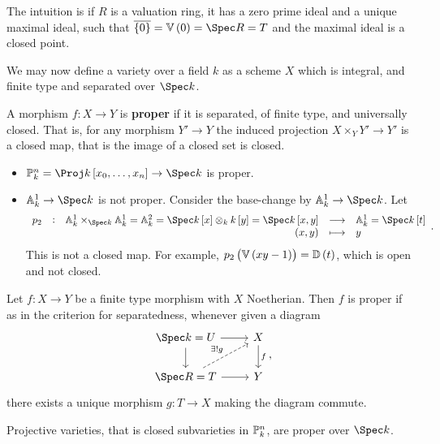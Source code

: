 
The intuition is if $ R $ is a valuation ring, it has a zero prime ideal and a unique maximal ideal, such that $ \overline{\cbr{0}} = \VV\br{0} = \Spec R = T $ and the maximal ideal is a closed point.

\begin{remark*}
We may now define a variety over a field $ k $ as a scheme $ X $ which is integral, and finite type and separated over $ \Spec k $.
\end{remark*}

\begin{definition*}
A morphism $ f : X \to Y $ is \textbf{proper} if it is separated, of finite type, and universally closed. That is, for any morphism $ Y' \to Y $ the induced projection $ X \times_Y Y' \to Y' $ is a closed map, that is the image of a closed set is closed.
\end{definition*}

\begin{example*}
\hfill
\begin{itemize}
\item $ \PP_k^n = \Proj k\sbr{x_0, \dots, x_n} \to \Spec k $ is proper.
\item $ \AA_k^1 \to \Spec k $ is not proper. Consider the base-change by $ \AA_k^1 \to \Spec k $. Let
$$ \function[p_2]{\AA_k^1 \times_{\Spec k} \AA_k^1 = \AA_k^2 = \Spec k\sbr{x} \otimes_k k\sbr{y} = \Spec k\sbr{x, y}}{\AA_k^1 = \Spec k\sbr{t}}{\br{x, y}}{y}. $$
This is not a closed map. For example, $ p_2\br{\VV\br{xy - 1}} = \DD\br{t} $, which is open and not closed.
\end{itemize}
\end{example*}

\begin{theorem}
Let $ f : X \to Y $ be a finite type morphism with $ X $ Noetherian. Then $ f $ is proper if as in the criterion for separatedness, whenever given a diagram
$$
\begin{tikzcd}
\Spec k = U \arrow{r} \arrow{d} & X \arrow{d}{f} \\
\Spec R = T \arrow[dashed]{ur}{\exists !g} \arrow{r} & Y
\end{tikzcd},
$$
there exists a unique morphism $ g : T \to X $ making the diagram commute.
\end{theorem}

\begin{example*}
Projective varieties, that is closed subvarieties in $ \mathbb{P}_k^n $, are proper over $ \Spec k $.
\end{example*}

